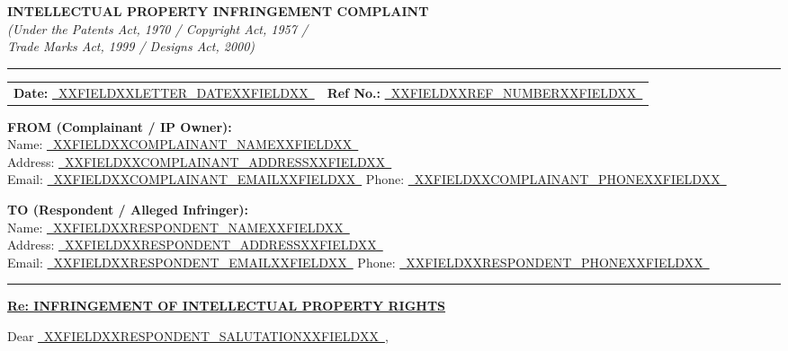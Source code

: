 \documentclass[12pt,a4paper]{article}
\newcommand{\fillline}[1]{\underline{~#1~}}
\begin{document}
\begin{center}
    {\LARGE\textbf{INTELLECTUAL PROPERTY INFRINGEMENT COMPLAINT}}\\[0.5em]
    {\normalsize\textit{(Under the Patents Act, 1970 / Copyright Act, 1957 /}}\\
    {\normalsize\textit{Trade Marks Act, 1999 / Designs Act, 2000)}}\\[1em]
    \rule{\linewidth}{0.4pt}
\end{center}

\vspace{0.5em}

\noindent
\begin{tabularx}{\textwidth}{@{}X r@{}}
    \textbf{Date:} \fillline{XXFIELDXXLETTER_DATEXXFIELDXX} &
    \textbf{Ref No.:} \fillline{XXFIELDXXREF_NUMBERXXFIELDXX}
\end{tabularx}

\vspace{1em}

\noindent\textbf{FROM (Complainant / IP Owner):}\\
Name: \fillline{XXFIELDXXCOMPLAINANT_NAMEXXFIELDXX}\\
Address: \fillline{XXFIELDXXCOMPLAINANT_ADDRESSXXFIELDXX}\\
Email: \fillline{XXFIELDXXCOMPLAINANT_EMAILXXFIELDXX} \quad Phone: \fillline{XXFIELDXXCOMPLAINANT_PHONEXXFIELDXX}

\vspace{1em}

\noindent\textbf{TO (Respondent / Alleged Infringer):}\\
Name: \fillline{XXFIELDXXRESPONDENT_NAMEXXFIELDXX}\\
Address: \fillline{XXFIELDXXRESPONDENT_ADDRESSXXFIELDXX}\\
Email: \fillline{XXFIELDXXRESPONDENT_EMAILXXFIELDXX} \quad Phone: \fillline{XXFIELDXXRESPONDENT_PHONEXXFIELDXX}

\vspace{1em}
\rule{\linewidth}{0.4pt}

\vspace{1em}

\noindent\textbf{\uline{Re: INFRINGEMENT OF INTELLECTUAL PROPERTY RIGHTS}}

\vspace{1em}

\noindent Dear \fillline{XXFIELDXXRESPONDENT_SALUTATIONXXFIELDXX},

\vspace{0.5em}
\end{document}
